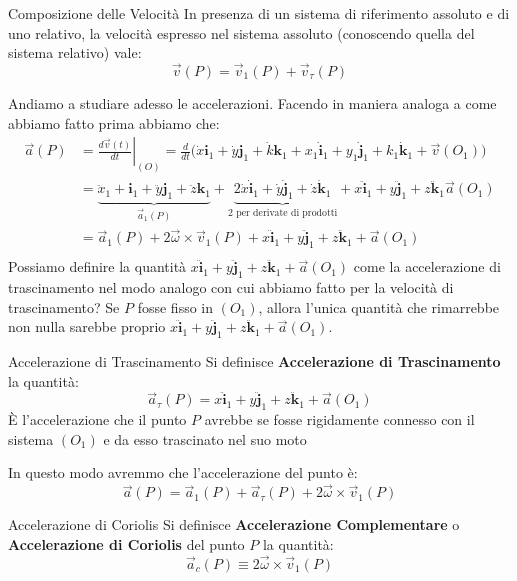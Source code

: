 \documentclass[11pt,a4paper,twoside]{article}
\theoremstyle{definition}
\begin{document}
\begin{thm}{Composizione delle Velocità}{}
	In presenza di un sistema di riferimento assoluto e di uno relativo, la velocità espresso nel sistema assoluto (conoscendo quella del sistema relativo) vale:
	\[ \vec v(P) = \vec v_1(P) + \vec v_\tau (P)\]
\end{thm}

Andiamo a studiare adesso le accelerazioni. Facendo in maniera analoga a come abbiamo fatto prima abbiamo che:
\begin{align*}
	\vec a(P) &= \left. \frac{d\vec v(t)}{dt}\right|_{(O)} = \frac d{dt}{\big(}\dot x \mathbf i_1 + \dot y \mathbf j_1 + \dot k \mathbf k_1 + {x_1 \dot{\mathbf i}_1 + y_1 \dot{\mathbf j}_1 + k_1 \dot{\mathbf k}_1} + \vec v(O_1){\big)}\\
	&= \underbrace{\ddot x_1 + \mathbf i_1 + \ddot y \mathbf j_1 + \ddot z \mathbf k_1}_{\vec a_1(P)} + \underbrace{2\dot x \dot{\mathbf i}_1 + \dot y \dot{\mathbf j}_1 + \dot z \dot{\mathbf k}_1}_{\text{2 per derivate di prodotti}} + x \ddot{\mathbf i}_1 + y\ddot{\mathbf j}_1 + z \ddot{\mathbf k}_1 \vec a(O_1)\\
	&= \vec a_1(P) + 2 \vec \omega \times \vec v_1(P) + x \ddot{\mathbf i}_1 + y\ddot{\mathbf j}_1 + z \ddot{\mathbf k}_1 + \vec a(O_1)\\
\end{align*}
Possiamo definire la quantità $ x \ddot{\mathbf i}_1 + y\ddot{\mathbf j}_1 + z \ddot{\mathbf k}_1 + \vec a(O_1)$ come la accelerazione di trascinamento nel modo analogo con cui abbiamo fatto per la velocità di trascinamento? Se $P$ fosse fisso in $(O_1)$, allora l'unica quantità che rimarrebbe non nulla sarebbe proprio $ x \ddot{\mathbf i}_1 + y\ddot{\mathbf j}_1 + z \ddot{\mathbf k}_1 + \vec a(O_1)$.

\begin{defn}{Accelerazione di Trascinamento}{}
	Si definisce \textbf{Accelerazione di Trascinamento} la quantità:
	\[ \vec a_\tau (P) =  x \ddot{\mathbf i}_1 + y\ddot{\mathbf j}_1 + z \ddot{\mathbf k}_1 + \vec a(O_1) \]
	È l'accelerazione che il punto $P$ avrebbe se fosse rigidamente connesso con il sistema $(O_1)$ e da esso trascinato nel suo moto
\end{defn}

In questo modo avremmo che l'accelerazione del punto è:
\[ \vec a(P) = \vec a_1(P) + \vec a_\tau(P) + 2\vec \omega \times \vec v_1(P) \]

\begin{defn}{Accelerazione di Coriolis}{}
	Si definisce \textbf{Accelerazione Complementare} o \textbf{Accelerazione di Coriolis} del punto $P$ la quantità:
	\[ \vec a_c(P) \equiv 2 \vec \omega \times \vec v_1(P)\]
\end{defn}
\end{document}
